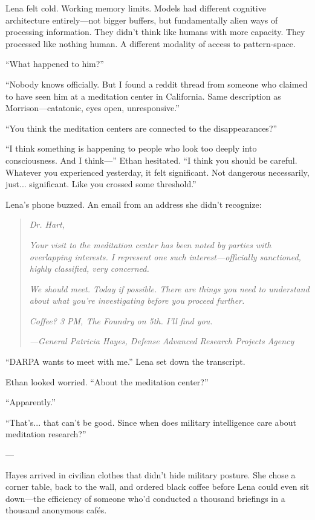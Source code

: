 Lena felt cold. Working memory limits. Models had different cognitive architecture entirely—not bigger buffers, but fundamentally alien ways of processing information. They didn't think like humans with more capacity. They processed like nothing human. A different modality of access to pattern-space.

``What happened to him?''

``Nobody knows officially. But I found a reddit thread from someone who claimed to have seen him at a meditation center in California. Same description as Morrison—catatonic, eyes open, unresponsive.''

``You think the meditation centers are connected to the disappearances?''

``I think something is happening to people who look too deeply into consciousness. And I think—'' Ethan hesitated. ``I think you should be careful. Whatever you experienced yesterday, it felt significant. Not dangerous necessarily, just... significant. Like you crossed some threshold.''

Lena's phone buzzed. An email from an address she didn't recognize:

\begin{quote}
\textit{Dr. Hart,}

\textit{Your visit to the meditation center has been noted by parties with overlapping interests. I represent one such interest—officially sanctioned, highly classified, very concerned.}

\textit{We should meet. Today if possible. There are things you need to understand about what you're investigating before you proceed further.}

\textit{Coffee? 3 PM, The Foundry on 5th. I'll find you.}

\textit{—General Patricia Hayes, Defense Advanced Research Projects Agency}
\end{quote}

``DARPA wants to meet with me.'' Lena set down the transcript.

Ethan looked worried. ``About the meditation center?''

``Apparently.''

``That's... that can't be good. Since when does military intelligence care about meditation research?''

---

Hayes arrived in civilian clothes that didn't hide military posture. She chose a corner table, back to the wall, and ordered black coffee before Lena could even sit down—the efficiency of someone who'd conducted a thousand briefings in a thousand anonymous cafés.

